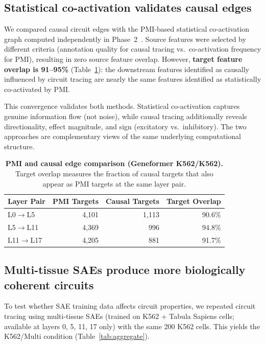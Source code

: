 \documentclass[onecolumn]{article}
\begin{document}
\subsection{Statistical co-activation validates causal edges}
\label{sec:pmi}

We compared causal circuit edges with the PMI-based statistical co-activation graph computed independently in Phase~2~\citep{kendiukhov2025sae_atlas}. Source features were selected by different criteria (annotation quality for causal tracing vs.\ co-activation frequency for PMI), resulting in zero source feature overlap. However, \textbf{target feature overlap is 91--95\%} (Table~\ref{tab:pmi}): the downstream features identified as causally influenced by circuit tracing are nearly the same features identified as statistically co-activated by PMI.

This convergence validates both methods. Statistical co-activation captures genuine information flow (not noise), while causal tracing additionally reveals directionality, effect magnitude, and sign (excitatory vs.\ inhibitory). The two approaches are complementary views of the same underlying computational structure.

\begin{table}[t]
\centering
\caption{\textbf{PMI and causal edge comparison (Geneformer K562/K562).} Target overlap measures the fraction of causal targets that also appear as PMI targets at the same layer pair.}
\label{tab:pmi}
\smallskip
\begin{tabular}{lrrr}
\toprule
Layer Pair & PMI Targets & Causal Targets & Target Overlap \\
\midrule
L0$\to$L5 & 4,101 & 1,113 & 90.6\% \\
L5$\to$L11 & 4,369 & 996 & 94.8\% \\
L11$\to$L17 & 4,205 & 881 & 91.7\% \\
\bottomrule
\end{tabular}
\end{table}


\subsection{Multi-tissue SAEs produce more biologically coherent circuits}
\label{sec:multitissue}

To test whether SAE training data affects circuit properties, we repeated circuit tracing using multi-tissue SAEs (trained on K562 + Tabula Sapiens cells; available at layers 0, 5, 11, 17 only) with the same 200 K562 cells. This yields the K562/Multi condition (Table~\ref{tab:aggregate}).
\end{document}
